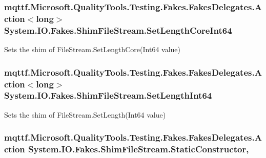 \hypertarget{class_system_1_1_i_o_1_1_fakes_1_1_shim_file_stream_ad0b643833566ce778a332379431c0ea6}{
\subsubsection[{Set\-Length\-Core\-Int64}]{\setlength{\rightskip}{0pt plus 5cm}mqttf.\-Microsoft.\-Quality\-Tools.\-Testing.\-Fakes.\-Fakes\-Delegates.\-Action$<$long$>$ System.\-I\-O.\-Fakes.\-Shim\-File\-Stream.\-Set\-Length\-Core\-Int64\hspace{0.3cm}{\ttfamily [set]}}}\label{class_system_1_1_i_o_1_1_fakes_1_1_shim_file_stream_ad0b643833566ce778a332379431c0ea6}


Sets the shim of File\-Stream.\-Set\-Length\-Core(\-Int64 value)

\hypertarget{class_system_1_1_i_o_1_1_fakes_1_1_shim_file_stream_a57c0008adba8b9db41f66c03baad28ff}{
\subsubsection[{Set\-Length\-Int64}]{\setlength{\rightskip}{0pt plus 5cm}mqttf.\-Microsoft.\-Quality\-Tools.\-Testing.\-Fakes.\-Fakes\-Delegates.\-Action$<$long$>$ System.\-I\-O.\-Fakes.\-Shim\-File\-Stream.\-Set\-Length\-Int64\hspace{0.3cm}{\ttfamily [set]}}}\label{class_system_1_1_i_o_1_1_fakes_1_1_shim_file_stream_a57c0008adba8b9db41f66c03baad28ff}


Sets the shim of File\-Stream.\-Set\-Length(\-Int64 value)

\hypertarget{class_system_1_1_i_o_1_1_fakes_1_1_shim_file_stream_a7b0672b5e8920b673f1913fc885a0c90}{
\subsubsection[{Static\-Constructor}]{\setlength{\rightskip}{0pt plus 5cm}mqttf.\-Microsoft.\-Quality\-Tools.\-Testing.\-Fakes.\-Fakes\-Delegates.\-Action System.\-I\-O.\-Fakes.\-Shim\-File\-Stream.\-Static\-Constructor\hspace{0.3cm}{\ttfamily [static]}, {\ttfamily [set]}}}\label{class_system_1_1_i_o_1_1_fakes_1_1_shim_file_stream_a7b0672b5e8920b673f1913fc885a0c90}


